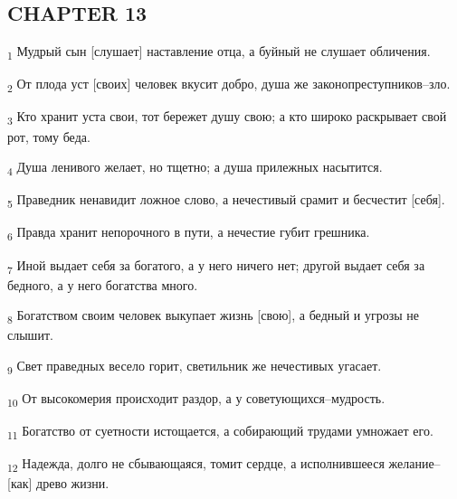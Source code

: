 \subsection{CHAPTER 13}
\begin{tcolorbox}
\textsubscript{1} Мудрый сын [слушает] наставление отца, а буйный не слушает обличения.
\end{tcolorbox}
\begin{tcolorbox}
\textsubscript{2} От плода уст [своих] человек вкусит добро, душа же законопреступников--зло.
\end{tcolorbox}
\begin{tcolorbox}
\textsubscript{3} Кто хранит уста свои, тот бережет душу свою; а кто широко раскрывает свой рот, тому беда.
\end{tcolorbox}
\begin{tcolorbox}
\textsubscript{4} Душа ленивого желает, но тщетно; а душа прилежных насытится.
\end{tcolorbox}
\begin{tcolorbox}
\textsubscript{5} Праведник ненавидит ложное слово, а нечестивый срамит и бесчестит [себя].
\end{tcolorbox}
\begin{tcolorbox}
\textsubscript{6} Правда хранит непорочного в пути, а нечестие губит грешника.
\end{tcolorbox}
\begin{tcolorbox}
\textsubscript{7} Иной выдает себя за богатого, а у него ничего нет; другой выдает себя за бедного, а у него богатства много.
\end{tcolorbox}
\begin{tcolorbox}
\textsubscript{8} Богатством своим человек выкупает жизнь [свою], а бедный и угрозы не слышит.
\end{tcolorbox}
\begin{tcolorbox}
\textsubscript{9} Свет праведных весело горит, светильник же нечестивых угасает.
\end{tcolorbox}
\begin{tcolorbox}
\textsubscript{10} От высокомерия происходит раздор, а у советующихся--мудрость.
\end{tcolorbox}
\begin{tcolorbox}
\textsubscript{11} Богатство от суетности истощается, а собирающий трудами умножает его.
\end{tcolorbox}
\begin{tcolorbox}
\textsubscript{12} Надежда, долго не сбывающаяся, томит сердце, а исполнившееся желание--[как] древо жизни.
\end{tcolorbox}
